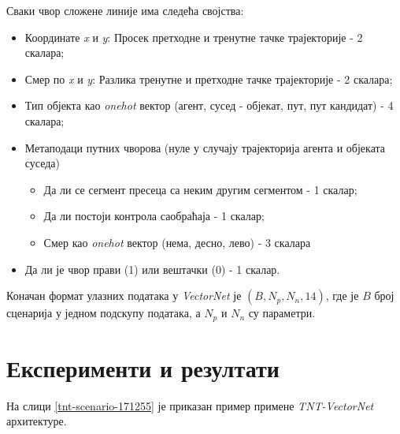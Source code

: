 \documentclass[11pt,oneside]{memoir}
\begin{document}
\noindent Сваки чвор сложене линије има следећа својства:
\begin{itemize}
  \item Координате \textit{x} и \textit{y}: Просек претходне и тренутне тачке трајекторије - 2 скалара;
  \item Смер по \textit{x} и \textit{y}: Разлика тренутне и претходне тачке трајекторије - 2 скалара;
  \item Тип објекта као \textit{onehot} вектор (агент, сусед - објекат, пут, пут кандидат) - 4 скалара;
  \item Метаподаци путних чворова (нуле у случају трајекторија агента и објеката суседа)
    \begin{itemize}
      \item Да ли се сегмент пресеца са неким другим сегментом - 1 скалар;
      \item Да ли постоји контрола саобраћаја - 1 скалар;
      \item Смер као \textit{onehot} вектор (нема, десно, лево) - 3 скалара
    \end{itemize}
  \item Да ли је чвор прави (1) или вештачки (0) - 1 скалар.
\end{itemize}

Коначан формат улазних података у \textit{VectorNet} је $(B, N_{p}, N_{n}, 14)$, где је $B$ број сценарија у једном подскупу података,
а $N_{p}$ и $N_{n}$ су параметри.

\section{Експерименти и резултати}

На слици \ref{tnt-scenario-171255} је приказан пример примене \textit{TNT-VectorNet} архитектуре. 
\end{document}
